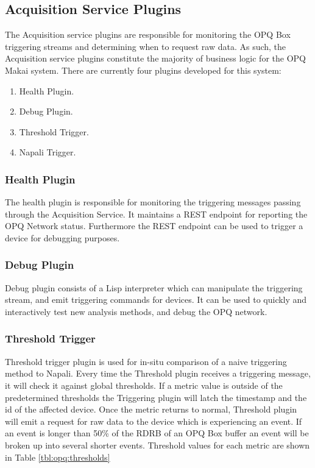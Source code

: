 \subsection{Acquisition Service Plugins}\label{subsec:acquisition-service-plugins}

The Acquisition service plugins are responsible for monitoring the OPQ Box triggering streams and determining when to request raw data.
As such, the Acquisition service plugins constitute the majority of business logic for the OPQ Makai system.
There are currently four plugins developed for this system:
\begin{enumerate}
	\item Health Plugin.
	\item Debug Plugin.
	\item Threshold Trigger.
	\item Napali Trigger.
\end{enumerate}

\subsubsection{Health Plugin}

The health plugin is responsible for monitoring the triggering messages passing through the Acquisition Service.
It maintains a REST endpoint for reporting the OPQ Network status.
Furthermore the REST endpoint can be used to trigger a device for debugging purposes.

\subsubsection{Debug Plugin}
Debug plugin consists of a Lisp interpreter which can manipulate the triggering stream, and emit triggering commands for devices.
It can be used to quickly and interactively test new analysis methods, and debug the OPQ network.

\subsubsection{Threshold Trigger}
Threshold trigger plugin is used for in-situ comparison of a naive triggering method to Napali.
Every time the Threshold plugin receives a triggering message, it will check it against global thresholds.
If a metric value is outside of the predetermined thresholds the Triggering plugin will latch the timestamp and the id of the affected device.
Once the metric returns to normal, Threshold plugin will emit a request for raw data to the device which is experiencing an event.
If an event is longer than 50\% of the RDRB of an OPQ Box buffer an event will be broken up into several shorter events.
Threshold values for each metric are shown in Table \ref{tbl:opq:thresholds}

